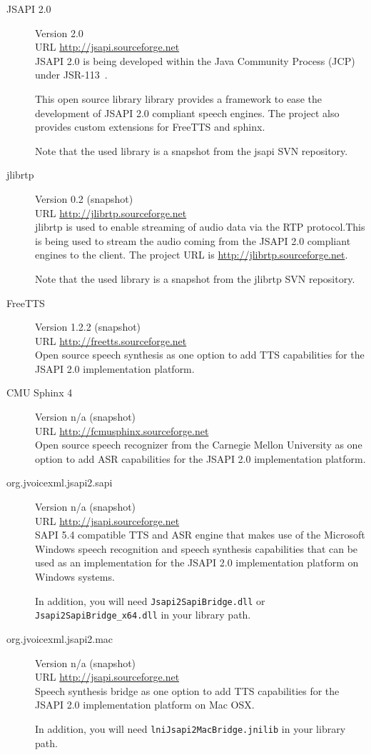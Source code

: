 \documentclass[11pt,a4paper]{article}
\begin{document}
\begin{description}
\item[JSAPI 2.0] Version 2.0 \\
URL \url{http://jsapi.sourceforge.net} \\
JSAPI 2.0 is being developed within the Java Community Process (JCP)~\cite{jcp}
under JSR-113~\cite{jcp:jsr113}.

This open source library library provides a framework to ease the development of
JSAPI 2.0 compliant speech engines. The project also provides custom extensions for
FreeTTS and sphinx.

Note that the used library is a snapshot from the jsapi SVN repository.
\item[jlibrtp] Version 0.2 (snapshot)\\
URL \url{http://jlibrtp.sourceforge.net} \\
jlibrtp is used to enable streaming of audio data via the RTP protocol.This
is being used to stream the audio coming from the JSAPI 2.0 compliant
engines to the client. The project URL is \url{http://jlibrtp.sourceforge.net}.

Note that the used library is a snapshot from the jlibrtp SVN repository.
\item[FreeTTS] Version 1.2.2 (snapshot)\\
URL \url{http://freetts.sourceforge.net} \\
Open source speech synthesis as one option to add TTS capabilities for the JSAPI
2.0 implementation platform.
\item[CMU Sphinx 4] Version n/a (snapshot)\\
URL \url{http://fcmusphinx.sourceforge.net} \\
Open source speech recognizer from the Carnegie Mellon University as one option
to add ASR capabilities for the JSAPI 2.0 implementation platform.
\item[org.jvoicexml.jsapi2.sapi] Version n/a (snapshot) \\
URL \url{http://jsapi.sourceforge.net} \\
SAPI 5.4 compatible TTS and ASR engine that makes use of the Microsoft Windows
speech recognition and speech synthesis capabilities that can be used as an
implementation for the JSAPI 2.0 implementation platform on Windows systems.

In addition, you will need \texttt{Jsapi2SapiBridge.dll} or
\texttt{Jsapi2SapiBridge\_x64.dll} in your library path.

\item[org.jvoicexml.jsapi2.mac] Version n/a (snapshot) \\
URL \url{http://jsapi.sourceforge.net} \\
Speech synthesis bridge as one option to add TTS capabilities for the JSAPI
2.0 implementation platform on Mac OSX.

In addition, you will need \texttt{lniJsapi2MacBridge.jnilib} in your library
path.
\end{description}
\end{document}
